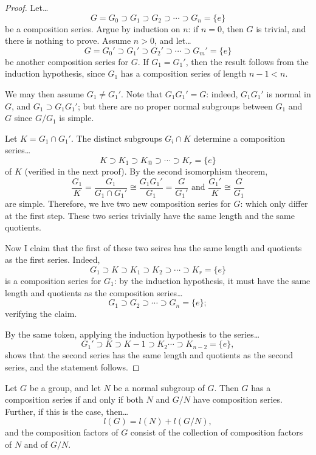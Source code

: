\begin{proof}
Let\dots
$$G = G_0 \supset G_1 \supset G_2 \supset \cdots \supset G_n = \{ e \}$$
be a composition series. Argue by induction on $n$: if $n = 0$, then $G$ is trivial, and there is nothing to prove. Assume $n > 0$, and let\dots
$$G = G_0' \supset G_1' \supset G_2' \supset \cdots \supset G_m' = \{ e \}$$
be another composition series for $G$. If $G_1 = G_1'$, then the result follows from the induction hypothesis, since $G_1$ has a composition series of length $n-1 < n$.

We may then assume $G_1 \neq G_1'$. Note that $G_1G_1' = G$: indeed, $G_1G_1'$ is normal in $G$, and $G_1 \supset G_1G_1'$; but there are no proper normal subgroups between $G_1$ and $G$
since $G/G_1$ is simple.

Let $K = G_1 \cap G_1'$. The distinct subgroups $G_i \cap K$ determine a composition series\dots
$$K \supset K_1 \supset K_@ \supset \cdots \supset K_r = \{ e \}$$
of $K$ (verified in the next proof). By the second isomorphism theorem,
$$\frac{G_1}{K} = \frac{G_1}{G_1 \cap G_1'} \cong \frac{G_1G_1'}{G_1} = \frac{G}{G_1'} \textrm{  and  } \frac{G_1'}{K} \cong \frac{G}{G_1}$$
are simple. Therefore, we hve two new composition series for $G$:
which only differ at the first step. These two series trivially have the same length and the same quotients.

Now I claim that the first of these two seires has the same length and quotients as the first series. Indeed,
$$G_1 \supset K \supset K_1 \supset K_2 \supset \cdots \supset K_r = \{ e \}$$
is a composition series for $G_1$: by the induction hypothesis, it must have the same length and quotients as the composition series\dots
$$G_1 \supset G_2 \supset \cdots \supset G_n = \{ e \};$$
verifying the claim.

By the same token, applying the induction hypothesis to the series\dots
$$G_1' \supset K \supset K-1 \supset K_2 \cdots \supset K_{n-2} = \{ e \},$$
shows that the second series has the same length and quotients as the second series, and the statement follows.
\end{proof}

\begin{proposition}
\label{subcompositionseries}
Let $G$ be a group, and let $N$ be a normal subgroup of $G$. Then $G$ has a composition series if and only if both $N$ and $G/N$ have composition series. Further, if this is the case, then\dots
$$l(G) = l(N) + l(G/N),$$
and the composition factors of $G$ consist of the collection of composition factors of $N$ and of $G/N$.
\end{proposition}

